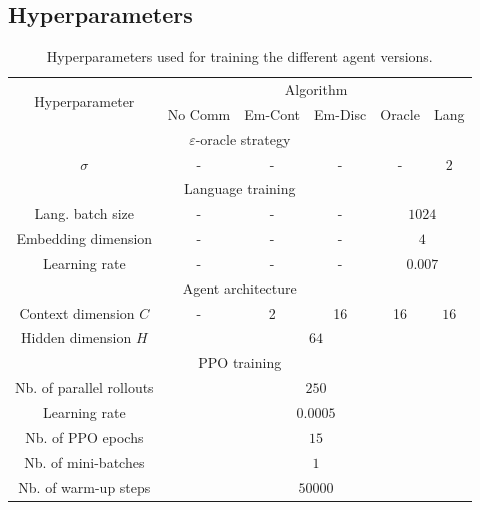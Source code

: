 \clearpage
\subsection{Hyperparameters}

\begin{table}[h]
    \centering
    \caption{Hyperparameters used for training the different agent versions.}
    \label{app:App_LAMAC_hyperparam}
    \begin{tabular}{|cccccc}
        \hline
        \multirow{2}{*}{Hyperparameter}  & \multicolumn{5}{|c|}{Algorithm} \\ \cline{2-6} 
                        & \multicolumn{1}{|c}{No Comm}     & \multicolumn{1}{c}{Em-Cont}     & \multicolumn{1}{c}{Em-Disc} & Oracle & \multicolumn{1}{c|}{Lang} \\ \hline 
        \multicolumn{6}{c}{$\varepsilon$-oracle strategy}  \\   \hline
        \multicolumn{1}{|c|}{$\sigma$}   & - & - & - & - & \multicolumn{1}{c|}{$2$}  \\  \hline
        
        \multicolumn{6}{c}{Language training}  \\   \hline
        \multicolumn{1}{|c|}{Lang. batch size}   & - & - & - & \multicolumn{2}{c|}{$1024$}  \\
        \multicolumn{1}{|c|}{Embedding dimension}   & - & - & - & \multicolumn{2}{c|}{$4$}  \\
        \multicolumn{1}{|c|}{Learning rate} & - & - & - & \multicolumn{2}{c|}{$0.007$}  \\   \hline
        
        \multicolumn{6}{c}{Agent architecture}  \\   \hline 
        \multicolumn{1}{|c|}{Context dimension $C$}       & -  & 2     & 16      & 16  & \multicolumn{1}{c|}{$16$}     \\ 
        \multicolumn{1}{|c|}{Hidden dimension $H$}   & \multicolumn{5}{c|}{$64$}  \\  \hline
        
        \multicolumn{6}{c}{PPO training}  \\   \hline
        \multicolumn{1}{|c|}{Nb. of parallel rollouts} & \multicolumn{5}{c|}{$250$}  \\ 
        \multicolumn{1}{|c|}{Learning rate} & \multicolumn{5}{c|}{$0.0005$}  \\ 
        \multicolumn{1}{|c|}{Nb. of PPO epochs} & \multicolumn{5}{c|}{$15$}  \\ 
        \multicolumn{1}{|c|}{Nb. of mini-batches} & \multicolumn{5}{c|}{$1$}  \\
        \multicolumn{1}{|c|}{Nb. of warm-up steps} & \multicolumn{5}{c|}{$50000$}  \\ \hline
    \end{tabular}
\end{table}

